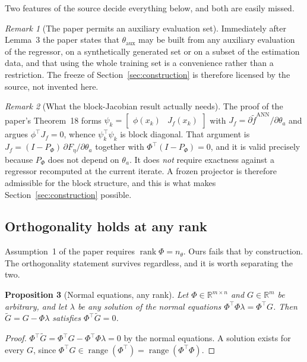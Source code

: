 \documentclass[11pt,a4paper]{article}
\newcommand{\R}{\mathbb R}
\newcommand{\ran}{\operatorname{range}}
\newcommand{\rank}{\operatorname{rank}}
\newtheorem{proposition}{Proposition}[section]
\theoremstyle{remark}
\newtheorem{remark}[proposition]{Remark}
\begin{document}
Two features of the source decide everything below, and both are easily missed.

\begin{remark}[The paper permits an auxiliary evaluation set]\label{rem:aux}
Immediately after Lemma~3 the paper states that $\theta_{\mathrm{aux}}$ may be built from any
auxiliary evaluation of the regressor, on a synthetically generated set or on a subset of the
estimation data, and that using the whole training set is a convenience rather than a restriction.
The freeze of Section~\ref{sec:construction} is therefore licensed by the source, not invented
here.
\end{remark}

\begin{remark}[What the block-Jacobian result actually needs]\label{rem:thm18}
The proof of the paper's Theorem~18 forms
$\psi_k=\begin{bmatrix}\phi(x_k)&J_f(x_k)\end{bmatrix}$ with
$J_f=\partial\widetilde f^{\mathrm{ANN}}/\partial\theta_a$ and argues
$\phi^\top J_f=0$, whence $\psi_k^\top\psi_k$ is block diagonal. That argument is
$J_f=(I-P_\Phi)\,\partial F_\eta/\partial\theta_a$ together with $\Phi^\top(I-P_\Phi)=0$, and it
is valid precisely because $P_\Phi$ does not depend on $\theta_a$. It does \emph{not} require
exactness against a regressor recomputed at the current iterate. A frozen projector is therefore
admissible for the block structure, and this is what makes Section~\ref{sec:construction}
possible.
\end{remark}

\subsection{Orthogonality holds at any rank}

Assumption~1 of the paper requires $\rank\Phi=n_\theta$. Ours fails that by construction. The
orthogonality statement survives regardless, and it is worth separating the two.

\begin{proposition}[Normal equations, any rank]\label{prop:anyrank}
Let $\Phi\in\R^{m\times n}$ and $G\in\R^{m}$ be arbitrary, and let $\lambda$ be any solution of
the normal equations $\Phi^\top\Phi\lambda=\Phi^\top G$. Then $\widetilde G=G-\Phi\lambda$
satisfies $\Phi^\top\widetilde G=0$.
\end{proposition}
\begin{proof}
$\Phi^\top\widetilde G=\Phi^\top G-\Phi^\top\Phi\lambda=0$ by the normal equations. A solution
exists for every $G$, since $\Phi^\top G\in\ran(\Phi^\top)=\ran(\Phi^\top\Phi)$.
\end{proof}
\end{document}
